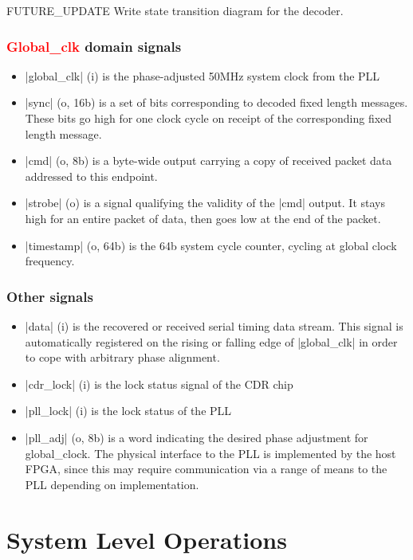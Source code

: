 \documentclass{dune}
\begin{document}
{\color{red}FUTURE\_UPDATE} Write state transition diagram for the decoder.

\subsubsection{\textcolor{red}{Global\_clk} domain signals}

\begin{itemize}
	\item |global_clk| (i) is the phase-adjusted 50MHz system clock from the PLL
	\item |sync| (o, 16b) is a set of bits corresponding to decoded fixed length messages. These bits go high for one clock cycle on receipt of the corresponding fixed length message.
	\item |cmd| (o, 8b) is a byte-wide output carrying a copy of received packet data addressed to this endpoint.
	\item |strobe| (o) is a signal qualifying the validity of the |cmd| output. It stays high for an entire packet of data, then goes low at the end of the packet.
	\item |timestamp| (o, 64b) is the 64b system cycle counter, cycling at global clock frequency.
\end{itemize}

\subsubsection{Other signals}

\begin{itemize}
	\item |data| (i) is the recovered or received serial timing data stream. This signal is automatically registered on the rising or falling edge of |global_clk| in order to cope with arbitrary phase alignment.
	\item |cdr_lock| (i) is the lock status signal of the CDR chip
	\item |pll_lock| (i) is the lock status of the PLL
	\item |pll_adj| (o, 8b) is a word indicating the desired phase adjustment for global\_clock. The physical interface to the PLL is implemented by the host FPGA, since this may require communication via a range of means to the PLL depending on implementation.
\end{itemize}

\section{System Level Operations}
\end{document}
